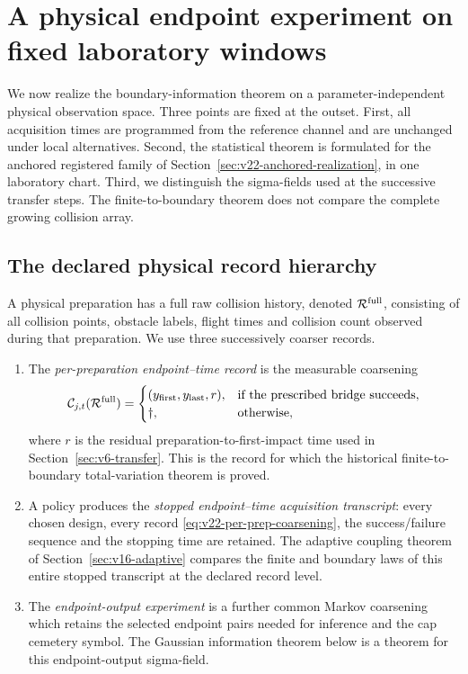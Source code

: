\section{A physical endpoint experiment on fixed laboratory windows}
\label{sec:v22-raw-physical}

We now realize the boundary-information theorem on a parameter-independent
physical observation space.  Three points are fixed at the outset.  First,
all acquisition times are programmed from the reference channel and are
unchanged under local alternatives.  Second, the statistical theorem is
formulated for the anchored registered family of
Section~\ref{sec:v22-anchored-realization}, in one laboratory chart.  Third,
we distinguish the sigma-fields used at the successive transfer steps.  The
finite-to-boundary theorem does not compare the complete growing collision
array.

\subsection{The declared physical record hierarchy}
\label{subsec:v22-record-hierarchy}

A physical preparation has a full raw collision history, denoted
$\mathcal R^{\rm full}$, consisting of all collision points, obstacle labels,
flight times and collision count observed during that preparation.  We use
three successively coarser records.

\begin{enumerate}
\item The \emph{per-preparation endpoint--time record} is the measurable
coarsening
\begin{equation}\label{eq:v22-per-prep-coarsening}
 \mathcal C_{j,t}(\mathcal R^{\rm full})=
 \begin{cases}
 (y_{\rm first},y_{\rm last},r),&\text{if the prescribed bridge succeeds},\\
 \dagger,&\text{otherwise},
 \end{cases}
\end{equation}
where $r$ is the residual preparation-to-first-impact time used in
Section~\ref{sec:v6-transfer}.  This is the record for which the historical
finite-to-boundary total-variation theorem is proved.

\item A policy produces the \emph{stopped endpoint--time acquisition
transcript}: every chosen design, every record
\eqref{eq:v22-per-prep-coarsening}, the success/failure sequence and the
stopping time are retained.  The adaptive coupling theorem of
Section~\ref{sec:v16-adaptive} compares the finite and boundary laws of this
entire stopped transcript at the declared record level.

\item The \emph{endpoint-output experiment} is a further common Markov
coarsening which retains the selected endpoint pairs needed for inference and
the cap cemetery symbol.  The Gaussian information theorem below is a theorem
for this endpoint-output sigma-field.
\end{enumerate}

